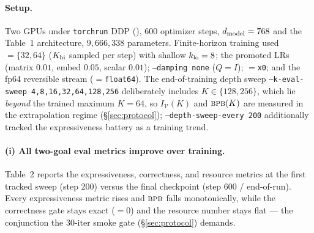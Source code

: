 \documentclass[11pt]{article}
\newcommand{\bpb}{\textsc{bpb}}
\newcommand{\code}[1]{\texttt{#1}}
\begin{document}
\paragraph{Setup.}
Two GPUs under \code{torchrun} DDP (\code{}), \(600\) optimizer steps,
\(d_{\rm model}=768\) and the Table~1 architecture, \(9{,}666{,}338\) parameters.  Finite-horizon
training used \code{}\(=\{32,64\}\) (\(K_{\rm hi}\) sampled per step) with shallow
\(k_{\rm lo}=8\); the promoted LRs (matrix \(0.01\), embed \(0.05\), scalar \(0.01\)); \code{--damping
none} (\(Q{=}I\)); \code{}\(=\)\code{x0}; and the fp64 reversible stream
(\code{}\(=\)\code{float64}).  The end-of-training depth sweep
\code{--k-eval-sweep 4,8,16,32,64,128,256} deliberately includes \(K\in\{128,256\}\), which lie
\emph{beyond} the trained maximum \(K{=}64\), so \(I_{\mathcal V}(K)\) and \(\bpb(K)\) are measured in
the extrapolation regime (\S\ref{sec:protocol}); \code{--depth-sweep-every 200} additionally tracked the
expressiveness battery as a training trend.

\paragraph{(i) All two-goal eval metrics improve over training.}
Table~2 reports the expressiveness, correctness, and resource metrics at the first tracked sweep
(step 200) versus the final checkpoint (step 600 / end-of-run).  Every expressiveness metric rises and
\(\bpb\) falls monotonically, while the correctness gate stays exact (\code{}\(=0\))
and the resource number stays flat --- the conjunction the 30-iter smoke gate (\S\ref{sec:protocol})
demands.
\end{document}
